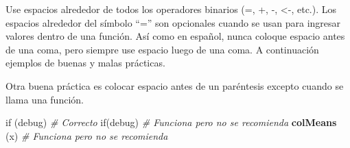 \documentclass[10pt,]{krantz}
\makeatletter
\newenvironment{Shaded}{\begin{snugshade}}{\end{snugshade}}
\newcommand{\KeywordTok}[1]{\textcolor[rgb]{0.13,0.29,0.53}{\textbf{{#1}}}}
\newcommand{\DecValTok}[1]{\textcolor[rgb]{0.00,0.00,0.81}{{#1}}}
\newcommand{\StringTok}[1]{\textcolor[rgb]{0.31,0.60,0.02}{{#1}}}
\newcommand{\CommentTok}[1]{\textcolor[rgb]{0.56,0.35,0.01}{\textit{{#1}}}}
\newcommand{\NormalTok}[1]{{#1}}
\newenvironment{kframe}{%
\medskip{}
\setlength{\fboxsep}{.8em}
 \def\at@end@of@kframe{}%
 \ifinner\ifhmode%
  \def\at@end@of@kframe{\end{minipage}}%
  \begin{minipage}{\columnwidth}%
 \fi\fi%
 \def\FrameCommand##1{\hskip\@totalleftmargin \hskip-\fboxsep
 \colorbox{shadecolor}{##1}\hskip-\fboxsep
     \hskip-\linewidth \hskip-\@totalleftmargin \hskip\columnwidth}%
 \MakeFramed {\advance\hsize-\width
   \@totalleftmargin\z@ \linewidth\hsize
   \@setminipage}}%
 {\par\unskip\endMakeFramed%
 \at@end@of@kframe}
\renewenvironment{Shaded}{\begin{kframe}}{\end{kframe}}
\makeatother
\begin{document}
Use espacios alrededor de todos los operadores binarios (=, +, -,
\textless{}-, etc.). Los espacios alrededor del símbolo ``='' son
opcionales cuando se usan para ingresar valores dentro de una función.
Así como en español, nunca coloque espacio antes de una coma, pero
siempre use espacio luego de una coma. A continuación ejemplos de buenas
y malas prácticas.

\begin{Shaded}
\end{Shaded}

Otra buena práctica es colocar espacio antes de un paréntesis excepto
cuando se llama una función.

\begin{Shaded}
\begin{Highlighting}[]
\NormalTok{if (debug)    }\CommentTok{# Correcto}
\NormalTok{if(debug)     }\CommentTok{# Funciona pero no se recomienda}
\KeywordTok{colMeans} \NormalTok{(x)  }\CommentTok{# Funciona pero no se recomienda}
\end{Highlighting}
\end{Shaded}
\end{document}
